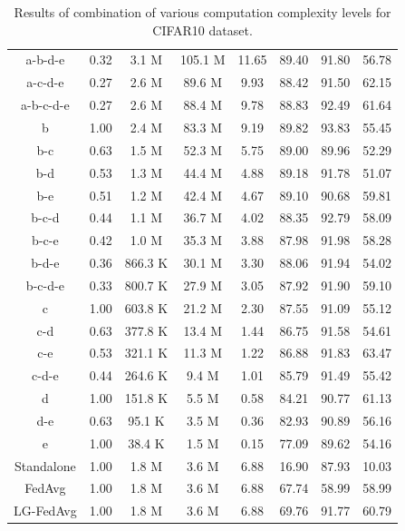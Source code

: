 \documentclass{article} %
\begin{document}
\begin{table}[hbtp]
{\begin{tabular}{@{}cccccccc@{}}
a-b-d-e    & 0.32 & 3.1 M   & 105.1 M & 11.65 & 89.40                & 91.80        & 56.78        \\
a-c-d-e    & 0.27 & 2.6 M   & 89.6 M  & 9.93  & 88.42                & 91.50        & 62.15        \\
a-b-c-d-e  & 0.27 & 2.6 M   & 88.4 M  & 9.78  & 88.83                & 92.49        & 61.64        \\
b          & 1.00 & 2.4 M   & 83.3 M  & 9.19  & 89.82                & 93.83        & 55.45        \\
b-c        & 0.63 & 1.5 M   & 52.3 M  & 5.75  & 89.00                & 89.96        & 52.29        \\
b-d        & 0.53 & 1.3 M   & 44.4 M  & 4.88  & 89.18                & 91.78        & 51.07        \\
b-e        & 0.51 & 1.2 M   & 42.4 M  & 4.67  & 89.10                & 90.68        & 59.81        \\
b-c-d      & 0.44 & 1.1 M   & 36.7 M  & 4.02  & 88.35                & 92.79        & 58.09        \\
b-c-e      & 0.42 & 1.0 M   & 35.3 M  & 3.88  & 87.98                & 91.98        & 58.28        \\
b-d-e      & 0.36 & 866.3 K & 30.1 M  & 3.30  & 88.06                & 91.94        & 54.02        \\
b-c-d-e    & 0.33 & 800.7 K & 27.9 M  & 3.05  & 87.92                & 91.90        & 59.10        \\
c          & 1.00 & 603.8 K & 21.2 M  & 2.30  & 87.55                & 91.09        & 55.12        \\
c-d        & 0.63 & 377.8 K & 13.4 M  & 1.44  & 86.75                & 91.58        & 54.61        \\
c-e        & 0.53 & 321.1 K & 11.3 M  & 1.22  & 86.88                & 91.83        & 63.47        \\
c-d-e      & 0.44 & 264.6 K & 9.4 M   & 1.01  & 85.79                & 91.49        & 55.42        \\
d          & 1.00 & 151.8 K & 5.5 M   & 0.58  & 84.21                & 90.77        & 61.13        \\
d-e        & 0.63 & 95.1 K  & 3.5 M   & 0.36  & 82.93                & 90.89        & 56.16        \\
e          & 1.00 & 38.4 K  & 1.5 M   & 0.15  & 77.09                & 89.62        & 54.16        \\ \midrule
Standalone \citep{liang2020think}& 1.00 & 1.8 M   & 3.6 M   & 6.88  & 16.90                & 87.93        & 10.03        \\
FedAvg \citep{liang2020think}& 1.00 & 1.8 M   & 3.6 M   & 6.88  & 67.74                & 58.99        & 58.99        \\
LG-FedAvg \citep{liang2020think} & 1.00 & 1.8 M   & 3.6 M   & 6.88  & 69.76                & 91.77        & 60.79        \\ \bottomrule
\end{tabular}
}
\caption{Results of combination of various computation complexity levels for CIFAR10 dataset.}
\label{tab:CIFAR10_appendix}
\end{table}
\end{document}
